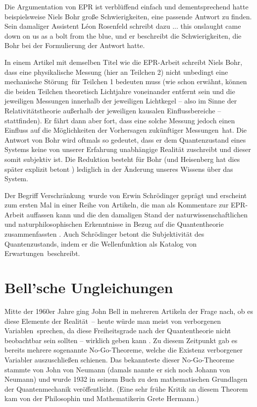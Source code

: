 Die Argumentation von EPR 
ist verbl\"uffend einfach und dementsprechend
hatte beispielsweise 
Niels Bohr gro\ss e Schwierigkeiten, eine
passende Antwort zu finden. Sein damaliger Assistent L\'{e}on
Rosenfeld schreibt dazu \glqq ... this onslaught came down on
us as a bolt from the blue\grqq, und er beschreibt die
Schwierigkeiten, die Bohr bei der Formulierung der Antwort hatte.

In einem Artikel
mit demselben Titel wie die EPR-Arbeit \cite{Bohr2}
schreibt Niels Bohr, dass eine physikalische Messung (hier an Teilchen 2)
nicht unbedingt eine \glqq mechanische St\"orung\grqq\ f\"ur
Teilchen 1 bedeuten muss (wie schon erw\"ahnt, k\"onnen die beiden Teilchen
theoretisch Lichtjahre voneinander entfernt sein und die
jeweiligen Messungen innerhalb der jeweiligen Lichtkegel
-- also im Sinne der Relativit\"atstheorie au\ss erhalb der 
jeweiligen kausalen Einflussbereiche --
stattfinden). Er f\"ahrt dann aber fort, dass eine solche Messung
jedoch \glqq
einen Einfluss auf die M\"oglichkeiten der Vorhersagen
zuk\"unftiger Messungen\grqq\ hat. Die Antwort von Bohr
wird oftmals so gedeutet, dass er dem Quantenzustand
eines Systems keine von unserer Erfahrung unabh\"angige
Realit\"at zuschreibt und dieser somit subjektiv ist. Die
Reduktion besteht f\"ur Bohr (und Heisenberg hat dies
sp\"ater explizit betont \cite{Heisenb}) lediglich in der \"Anderung unseres
Wissens \"uber das System.

Der Begriff \glqq Verschr\"ankung\grqq\ wurde von Erwin Schr\"odinger 
gepr\"agt und erscheint zum ersten Mal
in einer Reihe von Artikeln, die man als Kommentare zur EPR-Arbeit
auffassen kann und die den damaligen Stand der naturwissenschaftlichen und
naturphilosophischen Erkenntnisse in Bezug auf die Quantentheorie
zusammenfassten \cite{Schroedinger}. Auch Schr\"odinger betont die
Subjektivit\"at des Quantenzustands, indem er \glqq die Wellenfunktion
als Katalog von Erwartungen\grqq\ beschreibt.      
 
\section{Bell'sche Ungleichungen}
\label{sec_Bell}

Mitte der 1960er Jahre ging John Bell 
in mehreren Artikeln der Frage nach, ob es diese
\glqq Elemente der Realit\"at\grqq\ -- heute w\"urde
man meist von \glqq verborgenen Variablen\grqq\ sprechen,
da diese Freiheitsgrade nach der Quantentheorie nicht
beobachtbar sein sollten -- wirklich geben kann \cite{Bell3,Bell4}.
Zu diesem Zeitpunkt gab es bereits mehrere
sogenannte 
No-Go-Theoreme, welche die Existenz
verborgener Variabler auszuschlie\ss en schienen. 
Das bekannteste
dieser No-Go-Theoreme stammte von John von
Neumann 
(damals nannte er sich noch Johann von Neumann)
und wurde 1932 in seinem Buch zu den mathematischen
Grundlagen der Quantenmechanik \cite{Neumann}
ver\"offentlicht. (Eine sehr fr\"uhe Kritik an diesem Theorem
kam von der Philosophin und Mathematikerin Grete Hermann.)   %

